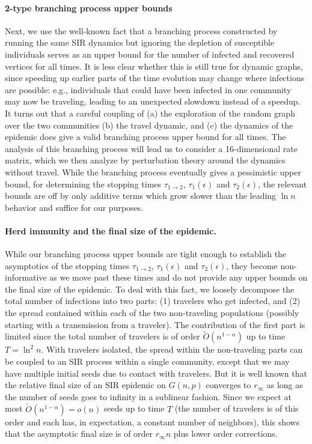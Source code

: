 \documentclass[11pt]{article}
\begin{document}
\paragraph{2-type branching process upper bounds} Next, we use the well-known fact that a branching process constructed by running the same SIR dynamics but ignoring the depletion of susceptible individuals serves as an upper bound for the number of infected and recovered vertices for all times. It is less clear whether this is still true for dynamic graphs, since speeding up earlier parts of the time evolution may change where infections are possible: e.g., individuals that could have been infected in one community may now be traveling, leading to an unexpected slowdown instead of a speedup. It turns out that a careful coupling of (a) the exploration of the random graph over the two communities (b) the travel dynamic, and (c) the dynamics of the epidemic does give a valid branching process upper bound for all times.  The analysis of this branching process will lead us to consider a 16-dimensional rate matrix, which we then analyze by perturbation theory around the dynamics without travel. While the branching process eventually gives a pessimistic upper bound, for determining the stopping times $\tau_{1\to 2}$, $\tau_1(\epsilon)$ and $\tau_2(\epsilon)$, the relevant bounds are off by only additive terms which grow slower than the leading $\ln n$ behavior and suffice for our purposes.

\paragraph{Herd immunity and the final size of the epidemic.}
While our branching process upper bounds are tight enough to establish the asymptotics of the stopping times $\tau_{1\to 2}$, $\tau_1(\epsilon)$ and $\tau_2(\epsilon)$, they become non-informative  as we move past these times and do not provide any upper bounds on the final size of the epidemic. To deal with this fact, we loosely decompose the total number of infections into two parts: (1) travelers who get infected, and (2) the spread contained within each of the two non-traveling populations (possibly starting with a transmission from a traveler). The contribution of the first part is limited since the total number of travelers is of order $\tilde O(n^{1-\alpha})$ up to time $T = \ln ^2 n$. With travelers isolated, the spread within the non-traveling parts can be coupled to an SIR process within a single community, except that we may have multiple initial seeds due to contact with travelers. But it is well known that the relative final size of an SIR epidemic on $G(n,p)$ converges to $r_\infty$ as long as the number of seeds goes to infinity in a sublinear fashion. Since we expect at most $\tilde O(n^{1-\alpha})=o(n)$ seeds up to time $T$ (the number of travelers is of this order and each has, in expectation, a constant number of neighbors), this shows that the asymptotic final size is of order $r_\infty n$ plus lower order corrections.
\end{document}
